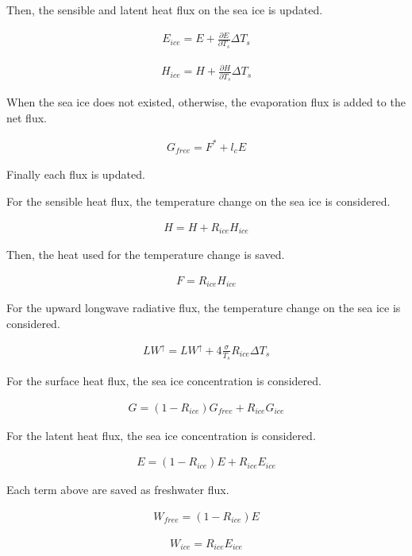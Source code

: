 Then, the sensible and latent heat flux on the sea ice is updated.

\begin{eqnarray}
    E_{ice} = E + \frac{\partial E}{\partial T_s}\Delta T_s
\end{eqnarray}

\begin{eqnarray}
    H_{ice} = H + \frac{\partial H}{\partial T_s}\Delta T_s
\end{eqnarray}

When the sea ice does not existed, otherwise, the evaporation flux is
added to the net flux.

\begin{eqnarray}
    G_{free}=F^* + l_cE
\end{eqnarray}

Finally each flux is updated.

For the sensible heat flux, the temperature change on the sea ice is
considered.

\begin{eqnarray}
    H=H+ R_{ice}  H_{ice}
\end{eqnarray}

Then, the heat used for the temperature change is saved.

\begin{eqnarray}
    F = R_{ice} H_{ice}
\end{eqnarray}

For the upward longwave radiative flux, the temperature change on the
sea ice is considered.

\begin{eqnarray}
    LW^\uparrow=LW^\uparrow +  4\frac{\sigma}{T_s}R_{ice}  \Delta T_s
\end{eqnarray}

For the surface heat flux, the sea ice concentration is considered.

\begin{eqnarray}
    G=(1-R_{ice})G_{free} + R_{ice}G_{ice}
\end{eqnarray}

For the latent heat flux, the sea ice concentration is considered.

\begin{eqnarray}
    E=(1-R_{ice})E + R_{ice}E_{ice}
\end{eqnarray}

Each term above are saved as freshwater flux.

\begin{eqnarray}
    W_{free} = (1-R_{ice}) E
\end{eqnarray}

\begin{eqnarray}
    W_{ice} = R_{ice} E_{ice}
\end{eqnarray}
